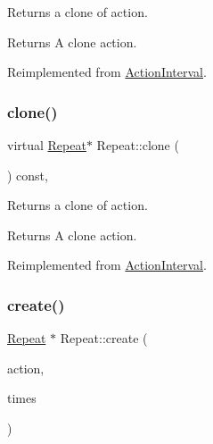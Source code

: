Returns a clone of action.

\begin{DoxyReturn}{Returns}
A clone action. 
\end{DoxyReturn}


Reimplemented from \hyperlink{classActionInterval_abc93ce0c2f54a90eb216a7803f25f44a}{Action\+Interval}.

\mbox{\label{classRepeat_a5f4faaabbc706ca8e4886fc00822cd1e}} 
\subsubsection{\texorpdfstring{clone()}{clone()}\hspace{0.1cm}{\footnotesize\ttfamily [2/2]}}
{\footnotesize\ttfamily virtual \hyperlink{classRepeat}{Repeat}$\ast$ Repeat\+::clone (\begin{DoxyParamCaption}\item[{void}]{ }\end{DoxyParamCaption}) const\hspace{0.3cm}{\ttfamily [override]}, {\ttfamily [virtual]}}

Returns a clone of action.

\begin{DoxyReturn}{Returns}
A clone action. 
\end{DoxyReturn}


Reimplemented from \hyperlink{classActionInterval_abc93ce0c2f54a90eb216a7803f25f44a}{Action\+Interval}.

\mbox{\label{classRepeat_a88174030837b1b6a2bebe265f5da64e9}} 
\subsubsection{\texorpdfstring{create()}{create()}\hspace{0.1cm}{\footnotesize\ttfamily [1/2]}}
{\footnotesize\ttfamily \hyperlink{classRepeat}{Repeat} $\ast$ Repeat\+::create (\begin{DoxyParamCaption}\item[{\hyperlink{classFiniteTimeAction}{Finite\+Time\+Action} $\ast$}]{action,  }\item[{unsigned int}]{times }\end{DoxyParamCaption})\hspace{0.3cm}{\ttfamily [static]}}

